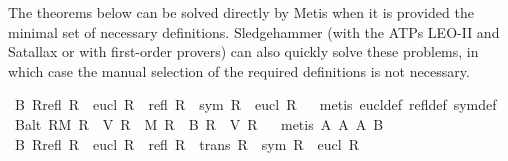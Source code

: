 \begin{isabellebody}
\begin{isamarkuptext}
The theorems below can be solved directly by Metis when it is provided the 
minimal set of necessary definitions. Sledgehammer (with the ATPs LEO-II and Satallax or with first-order provers) can also 
quickly solve these problems, in which case the manual selection of the required definitions is not necessary.%
\end{isamarkuptext}%
\isamarkuptrue%
%
\isamarkuptrue%
\isamarkupfalse%
\ B{}{\isacharcolon}\ {\isachardoublequoteopen}{\isasymforall}R{\isachardot}{\isacharparenleft}{\isacharparenleft}refl\ R{\isacharparenright}\ {\isasymand}\ {\isacharparenleft}eucl\ R{\isacharparenright}{\isacharparenright}\ {\isasymlongleftrightarrow}\ {\isacharparenleft}{\isacharparenleft}refl\ R{\isacharparenright}\ {\isasymand}\ {\isacharparenleft}sym\ R{\isacharparenright}\ {\isasymand}\ {\isacharparenleft}eucl\ R{\isacharparenright}{\isacharparenright}{\isachardoublequoteclose}\isanewline
%
\isadelimproof
\ %
\endisadelimproof
%
\isatagproof
{}\isamarkupfalse%
\ {\isacharparenleft}metis\ eucl{\isacharunderscore}def\ refl{\isacharunderscore}def\ sym{\isacharunderscore}def{\isacharparenright}%
\endisatagproof
{\isafoldproof}%
%
\isadelimproof
\ \isanewline
%
\endisadelimproof
{}\isamarkupfalse%
\ B{}{\isacharunderscore}alt{\isacharcolon}\ {\isachardoublequoteopen}{\isasymforall}R{\isachardot}{\isacharparenleft}{\isacharparenleft}M\ R{\isacharparenright}\ {\isasymand}\ {\isacharparenleft}V\ R{\isacharparenright}{\isacharparenright}\ {\isasymlongleftrightarrow}\ {\isacharparenleft}{\isacharparenleft}M\ R{\isacharparenright}\ {\isasymand}\ {\isacharparenleft}B\ R{\isacharparenright}\ {\isasymand}\ {\isacharparenleft}V\ R{\isacharparenright}{\isacharparenright}{\isachardoublequoteclose}\isanewline
%
\isadelimproof
\ %
\endisadelimproof
%
\isatagproof
{}\isamarkupfalse%
\ {\isacharparenleft}metis\ A{}\ A{}\ A{}\ B{}{\isacharparenright}%
\endisatagproof
{\isafoldproof}%
%
\isadelimproof
%
\endisadelimproof
%
\isamarkuptrue%
\isamarkupfalse%
\ B{}{\isacharcolon}\ {\isachardoublequoteopen}{\isasymforall}R{\isachardot}{\isacharparenleft}{\isacharparenleft}refl\ R{\isacharparenright}\ {\isasymand}\ {\isacharparenleft}eucl\ R{\isacharparenright}{\isacharparenright}\ {\isasymlongleftrightarrow}\ {\isacharparenleft}{\isacharparenleft}refl\ R{\isacharparenright}\ {\isasymand}\ {\isacharparenleft}trans\ R{\isacharparenright}\ {\isasymand}\ {\isacharparenleft}sym\ R{\isacharparenright}\ {\isasymand}\ {\isacharparenleft}eucl\ R{\isacharparenright}{\isacharparenright}{\isachardoublequoteclose}\isanewline

\end{isabellebody}
